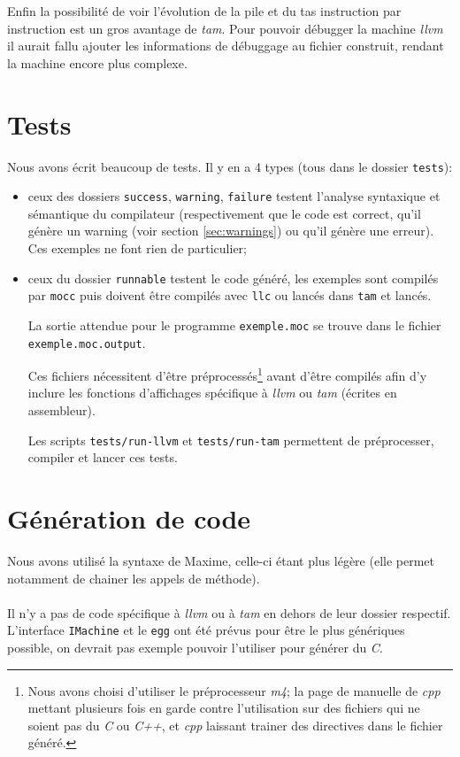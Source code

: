 \documentclass{scrartcl}
\newcommand{\egg} {\texttt{egg}}
\newcommand{\mocc}{\texttt{mocc}}
\newcommand{\llvm}{\textit{llvm}}
\newcommand{\tam} {\textit{tam}}
\begin{document}
  Enfin la possibilité de voir l'évolution de la pile et du tas instruction par
  instruction est un gros avantage de \tam{}. Pour pouvoir débugger la machine
  \llvm{} il aurait fallu ajouter les informations de débuggage au fichier
  construit, rendant la machine encore plus complexe.

\section{Tests}
  Nous avons écrit beaucoup de tests. Il y en a 4 types (tous dans le
  dossier \verb+tests+):
  \begin{itemize}
    \item ceux des dossiers \verb+success+, \verb+warning+, \verb+failure+
      testent l'analyse syntaxique et sémantique du compilateur (respectivement
      que le code est correct, qu'il génère un warning (voir section
      \ref{sec:warnings}) ou qu'il génère une erreur). Ces exemples ne font
      rien de particulier;
    \item ceux du dossier \verb+runnable+ testent le code généré, les exemples
      sont compilés par \mocc{} puis doivent être compilés avec \verb+llc+
      ou lancés dans \verb+tam+ et lancés.

      La sortie attendue pour le programme \verb+exemple.moc+ se trouve dans
      le fichier \verb+exemple.moc.output+.

      Ces fichiers nécessitent d'être préprocessés\footnote{Nous avons choisi
      d'utiliser le préprocesseur \textit{m4}; la page de manuelle de
      \textit{cpp} mettant plusieurs fois en garde contre l'utilisation sur des
      fichiers qui ne soient pas du \textit{C} ou \textit{C++}, et \textit{cpp}
      laissant trainer des directives dans le fichier généré.} avant d'être
      compilés afin d'y inclure les fonctions d'affichages spécifique à \llvm{}
      ou \tam{} (écrites en assembleur).

      Les scripts \verb+tests/run-llvm+ et \verb+tests/run-tam+ permettent de
      préprocesser, compiler et lancer ces tests.
  \end{itemize}

\section{Génération de code}
  Nous avons utilisé la syntaxe de Maxime, celle-ci étant plus légère (elle
  permet notamment de chainer les appels de méthode).

  \paragraph{}
  Il n'y a pas de code spécifique à \llvm{} ou à \tam{} en dehors de leur
  dossier respectif. L'interface \verb+IMachine+ et le \egg{} ont été prévus
  pour être le plus génériques possible, on devrait pas exemple pouvoir
  l'utiliser pour générer du \textit{C}.
\end{document}
